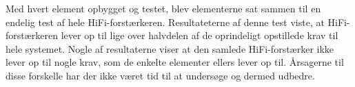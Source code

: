 Med hvert element opbygget og testet, blev elementerne sat sammen til en endelig test af hele HiFi-forstærkeren. Resultateterne af denne test viste, at HiFi-forstærkeren lever op til lige over halvdelen af de oprindeligt opstillede krav til hele systemet. Nogle af resultaterne viser at den samlede HiFi-forstærker ikke lever op til nogle krav, som de enkelte elementer ellers lever op til. Årsagerne til disse forskelle har der ikke været tid til at undersøge og dermed udbedre.

